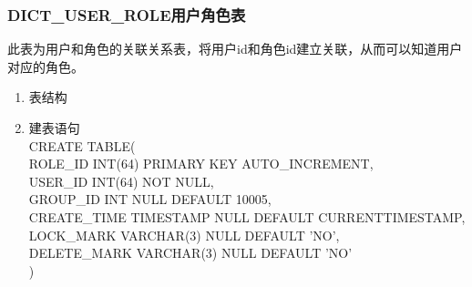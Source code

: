 \subsubsection{DICT\_USER\_ROLE用户角色表}
此表为用户和角色的关联关系表，将用户id和角色id建立关联，从而可以知道用户对应的角色。
\begin{enumerate}
    \item 表结构
    \begin{table}[htbp]
        \centering
        \end{table}
    \item 建表语句\\
        CREATE TABLE(\\
            ROLE\_ID INT(64) PRIMARY KEY AUTO\_INCREMENT,\\
            USER\_ID INT(64) NOT NULL, \\
            GROUP\_ID INT NULL DEFAULT 10005, \\
            CREATE\_TIME TIMESTAMP NULL DEFAULT CURRENTTIMESTAMP,\\
            LOCK\_MARK VARCHAR(3) NULL DEFAULT 'NO', \\            
            DELETE\_MARK VARCHAR(3) NULL DEFAULT 'NO'\\
        )
    \end{enumerate}

